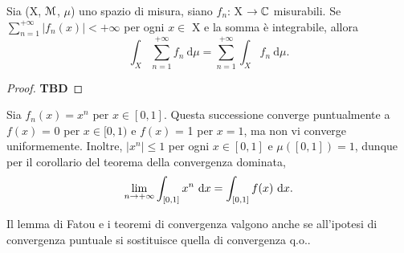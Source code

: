 \documentclass[Completo.tex]{subfiles}
\begin{document}
\begin{Cor}
	Sia (X, $\eu[M]$, $\mu$) uno spazio di misura, siano $f_n$: X $\ra \bb[C]$ misurabili. Se $\sum_{n=1}^{+\infty} \vert f_n(x) \vert < +\infty$ per ogni $x \in$ X e la somma è integrabile, allora
	\begin{equation*}
	\int_X \sum\limits_{n=1}^{+\infty} f_n \ \mathrm{d}\mu = \sum\limits_{n=1}^{+\infty} \int_X f_n \ \mathrm{d}\mu.
	\end{equation*}
\end{Cor}
\begin{proof}
	\textbf{TBD}
\end{proof}
\begin{Ex}
	Sia $f_n(x) = x^n$ per $x \in [0,1]$. Questa successione converge puntualmente a $f(x)$ = 0 per $x \in [0,1)$ e $f(x)$ = 1 per $x = 1$, ma non vi converge uniformemente. Inoltre, $\vert x^n \vert \leq 1$ per ogni $x \in [0,1]$ e $\mu([0,1]) = 1$, dunque per il corollario del teorema della convergenza dominata,
	\begin{equation*}
	\lim_{n \ra +\infty} \int_{[0,1]} x^n \ \mathrm{d}x = \int_{[0,1]} f(x) \ \mathrm{d}x.
	\end{equation*}
\end{Ex}

\begin{Rem}
	Il lemma di Fatou e i teoremi di convergenza valgono anche se all'ipotesi di convergenza puntuale si sostituisce quella di convergenza q.o..
\end{Rem}
\end{document}

